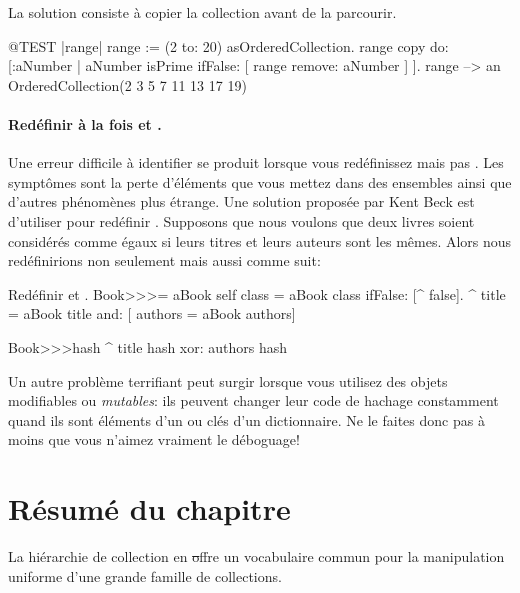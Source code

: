 \documentclass[a4paper,10pt,twoside]{book}
\begin{document}
La solution consiste \`a copier la collection avant de la parcourir.
\begin{code}{@TEST |range|}
range := (2 to: 20) asOrderedCollection.
range copy do: [:aNumber | aNumber isPrime ifFalse: [ range remove: aNumber ] ].
range --> an OrderedCollection(2 3 5 7 11 13 17 19)
\end{code}

\paragraph{Red\'efinir \`a la fois \ct{=} et .}
Une erreur difficile \`a identifier se produit lorsque vous
red\'efinissez \ct{=} mais pas . Les sympt\^omes sont
la perte d'\'el\'ements que vous mettez dans des ensembles ainsi
que d'autres ph\'enom\`enes plus \'etrange. Une solution propos\'ee
par Kent Beck est d'utiliser  pour red\'efinir .
Supposons que nous voulons que deux livres soient consid\'er\'es comme
\'egaux si leurs titres et leurs auteurs sont les m\^emes.
Alors nous red\'efinirions non seulement
\ct{=} mais aussi  comme suit:

\begin{method}{Red\'efinir \lct{=} et .}
Book>>>= aBook
   self class = aBook class ifFalse: [^ false].
   ^ title = aBook title and: [ authors = aBook authors]

Book>>>hash 
   ^ title hash xor: authors hash
\end{method}

Un autre probl\`eme terrifiant peut surgir lorsque vous utilisez des
objets modifiables ou \emph{mutables}: ils peuvent changer leur
code de hachage constamment quand ils sont \'el\'ements d'un 
ou cl\'es d'un dictionnaire. 
Ne le faites donc pas à moins que vous n'aimez vraiment le d\'eboguage!

\section{R\'esum\'e du chapitre}

La hi\'erarchie de collection en \st offre un vocabulaire commun pour la manipulation uniforme d'une grande famille de collections.
\end{document}
